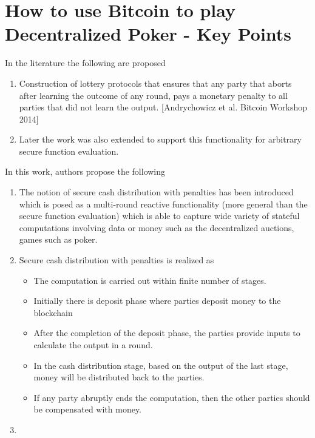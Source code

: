 \documentclass{article}
\begin{document}
\section{How to use Bitcoin to play Decentralized Poker - Key Points}
In the literature the following are proposed
\begin{enumerate}
\item Construction of lottery protocols that ensures that any party that aborts after learning the outcome of any round, pays a monetary penalty to all parties that did not learn the output. [Andrychowicz et al. Bitcoin Workshop 2014]
\item Later the work was also extended to support this functionality for arbitrary secure function evaluation.
\end{enumerate}
In this work, authors propose the following
\begin{enumerate}
\item The notion of secure cash distribution with penalties has been introduced which is posed as a multi-round reactive functionality (more general than the secure function evaluation) which is able to capture wide variety of stateful computations involving data or money such as the decentralized auctions, games such as poker.
\item Secure cash distribution with penalties is realized as
\begin{itemize}
\item The computation is carried out within finite number of stages.
\item Initially there is deposit phase where parties deposit money to the blockchain
\item After the completion of the deposit phase, the parties provide inputs to calculate the output in a round.
\item In the cash distribution stage, based on the output of the last stage, money will be distributed back to the parties.
\item If any party abruptly ends the computation, then the other parties should be compensated with money.
\end{itemize}
\item 
\end{enumerate}
\end{document}
